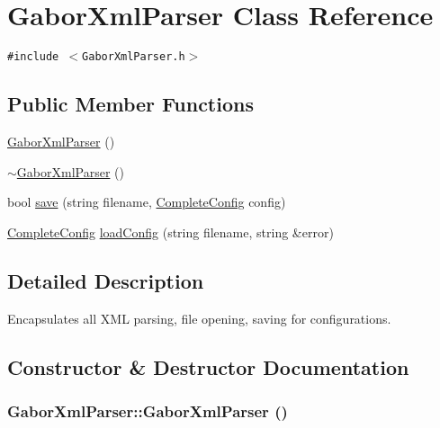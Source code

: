 \hypertarget{classGaborXmlParser}{
\section{GaborXmlParser Class Reference}
\label{classGaborXmlParser}
}
{\tt \#include $<$GaborXmlParser.h$>$}

\subsection*{Public Member Functions}
\begin{CompactItemize}
\item 
\hyperlink{classGaborXmlParser_53abe9b7f8cbd1654273f2220dfb8ea0}{GaborXmlParser} ()
\item 
\hyperlink{classGaborXmlParser_e834789f7d64688cf343ee2a84e299b5}{$\sim$GaborXmlParser} ()
\item 
bool \hyperlink{classGaborXmlParser_fbf69ecd4a1e4354093c908e4e03fab3}{save} (string filename, \hyperlink{classCompleteConfig}{CompleteConfig} config)
\item 
\hyperlink{classCompleteConfig}{CompleteConfig} \hyperlink{classGaborXmlParser_a03d1e604ec6e694d831d4cc6aa45465}{loadConfig} (string filename, string \&error)
\end{CompactItemize}


\subsection{Detailed Description}
Encapsulates all XML parsing, file opening, saving for configurations. 

\subsection{Constructor \& Destructor Documentation}
\hypertarget{classGaborXmlParser_53abe9b7f8cbd1654273f2220dfb8ea0}{
\subsubsection[{GaborXmlParser}]{\setlength{\rightskip}{0pt plus 5cm}GaborXmlParser::GaborXmlParser ()}}
\label{classGaborXmlParser_53abe9b7f8cbd1654273f2220dfb8ea0}


